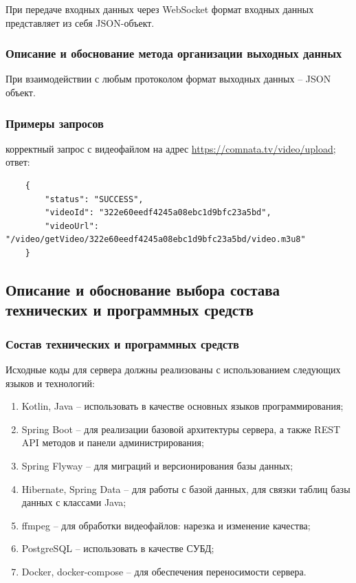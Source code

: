 \documentclass{../includes/TechDoc}
\begin{document}
    При передаче входных данных через WebSocket формат входных данных представляет из себя JSON-объект.

    \subsubsection{Описание и обоснование метода организации выходных данных}

    При взаимодействии с любым протоколом формат выходных данных -- JSON объект.

    \subsubsection{Примеры запросов}

     корректный запрос с видеофайлом на адрес \url{https://comnata.tv/video/upload};\\

     ответ:
    \begin{lstlisting}
    {
  		"status": "SUCCESS",
  		"videoId": "322e60eedf4245a08ebc1d9bfc23a5bd",
  		"videoUrl": "/video/getVideo/322e60eedf4245a08ebc1d9bfc23a5bd/video.m3u8"
	}
    \end{lstlisting}

    \clearpage

    \subsection{Описание и обоснование выбора состава технических и программных средств}

    \subsubsection{Состав технических и программных средств}

    Исходные коды для сервера должны реализованы с использованием следующих языков и технологий:
    \begin{enumerate}[noitemsep]
        \item Kotlin, Java -- использовать в качестве основных языков программирования;
        \item Spring Boot -- для реализации базовой архитектуры сервера, а также REST API методов и панели администрирования;
        \item Spring Flyway -- для миграций и версионирования базы данных;
        \item Hibernate, Spring Data -- для работы с базой данных, для связки таблиц базы данных с классами Java;
        \item ffmpeg -- для обработки видеофайлов: нарезка и изменение качества;
        \item PostgreSQL -- использовать в качестве СУБД;
        \item Docker, docker-compose -- для обеспечения переносимости сервера.
    \end{enumerate}
\end{document}
